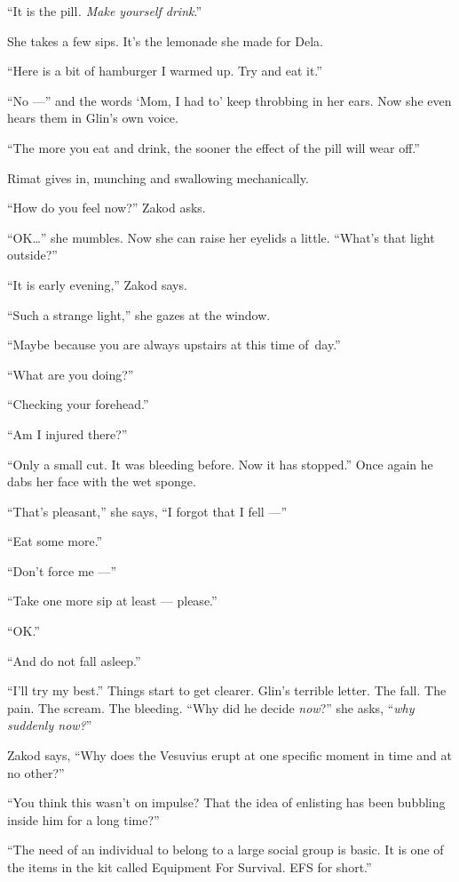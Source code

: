 \documentclass[twoside,11pt]{book}
\begin{document}
``It is the pill\textit{. Make yourself drink}.{}''

She takes a few sips. It's the lemonade she made for Dela.

``Here is a bit of hamburger I warmed up. Try and eat it.{}''

``No ---'' and the words `Mom, I had to' keep throbbing in her ears. Now she even hears them in Glin's own voice.

``The more you eat and drink, the sooner the effect of the pill will wear off.''

Rimat gives in, munching and swallowing mechanically.

``How do you feel now?'' Zakod asks.

``OK{\ldots}'' she mumbles. Now she can raise her eyelids a little. ``What's that light outside?''

``It is early evening,'' Zakod says.

``Such a strange light,'' she gazes at the window.

``Maybe because you are always upstairs at this time of~day.''

``What are you doing?''

``Checking your forehead.''

``Am I injured there?''

``Only a small cut. It was bleeding before. Now it has stopped.'' Once again he dabs her face with the wet sponge.

``That's pleasant,'' she says, ``I forgot that I fell ---''

``Eat some more.''

``Don't force me ---''

``Take one more sip at least --- please.''

``OK.''

``And do not fall asleep.''

``I'll try my best.'' Things start to get clearer. Glin's terrible letter. The fall. The pain. The scream. The
bleeding. ``Why did he decide \textit{now}?'' she asks, ``\textit{why suddenly now?}{}''

Zakod says, ``Why does the Vesuvius erupt at one specific moment in time and at no other?''

{}``You think this wasn't on impulse? That the idea of enlisting has been bubbling inside him for a long
time?''

``The need of an individual to belong to a large social group is basic. It is one of the items in the kit
called Equipment For Survival. EFS for short.''
\end{document}
